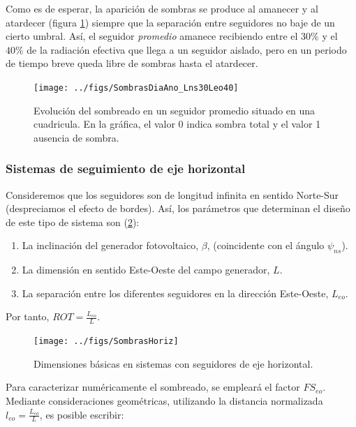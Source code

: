 Como es de esperar, la aparición de sombras se produce al amanecer
y al atardecer (figura \ref{fig:CuadriculaFija}) siempre que la separación
entre seguidores no baje de un cierto umbral. Así, el seguidor \emph{promedio}
amanece recibiendo entre el $30\%$ y el $40\%$ de la radiación efectiva
que llega a un seguidor aislado, pero en un periodo de tiempo breve
queda libre de sombras hasta el atardecer. 

%
\begin{figure}
\begin{centering}
\texttt{[image: ../figs/SombrasDiaAno\_Lns30Leo40]}
\end{centering}

\caption[Evolución del sombreado en un seguidor
promedio]{\label{fig:CuadriculaFija}
Evolución del sombreado en un seguidor
promedio situado en una cuadricula. 
En la gráfica, el valor 0 indica
sombra total y el valor 1 ausencia de sombra.}

\end{figure}

\subsubsection{Sistemas de seguimiento de eje horizontal}

Consideremos que los seguidores son de longitud infinita en sentido
Norte-Sur (despreciamos el efecto de bordes). Así, los parámetros
que determinan el diseño de este tipo de sistema son (\ref{fig:SeguidorEjeHorizontalSombras}):

\begin{enumerate}
\item La inclinación del generador fotovoltaico, $\beta$, (coincidente
con el ángulo $\psi_{ns}$).
\item La dimensión en sentido Este-Oeste del campo generador, $L$.
\item La separación entre los diferentes seguidores en la dirección Este-Oeste,
$L_{eo}$. 
\end{enumerate}

Por tanto, $ROT=\frac{L_{eo}}{L}$.

\begin{figure}
  \centering
  \texttt{[image: ../figs/SombrasHoriz]}
  \caption{Dimensiones básicas en sistemas con seguidores de eje horizontal.}
  \label{fig:SeguidorEjeHorizontalSombras}
\end{figure}

Para caracterizar numéricamente el sombreado, se empleará el factor
$FS_{eo}$. Mediante consideraciones geométricas, utilizando la
distancia normalizada $l_{eo}=\frac{L_{eo}}{L}$, es posible escribir:

